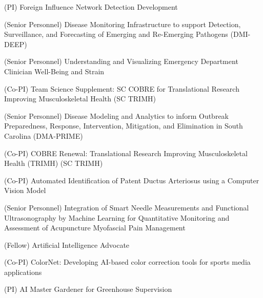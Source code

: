 \documentclass[11pt,letterpaper,roman]{moderncv}        %
\begin{document}
\quad (PI) Foreign Influence Network Detection Development

\quad (Senior Personnel) Disease Monitoring Infrastructure to support Detection, Surveillance, and Forecasting of Emerging and Re-Emerging Pathogens (DMI-DEEP)

\quad (Senior Personnel) Understanding and Visualizing Emergency Department Clinician Well-Being and Strain


\quad (Co-PI) Team Science Supplement: SC COBRE for Translational Research Improving Musculoskeletal Health (SC TRIMH)

\quad (Senior Personnel) Disease Modeling and Analytics to inform Outbreak Preparedness, Response, Intervention, Mitigation, and Elimination in South Carolina (DMA-PRIME)

\quad (Co-PI) COBRE Renewal: Translational Research Improving Musculoskeletal Health (TRIMH) (SC TRIMH)

\quad (Co-PI) Automated Identification of Patent Ductus Arteriosus using a Computer Vision Model

\quad (Senior Personnel) Integration of Smart Needle Measurements and Functional Ultrasonography by Machine Learning for Quantitative Monitoring and Assessment of Acupuncture Myofascial Pain Management

\quad (Fellow) Artificial Intelligence Advocate

\quad (Co-PI) ColorNet: Developing AI-based color correction tools for sports media applications

\quad (PI) AI Master Gardener for Greenhouse Supervision
\end{document}
